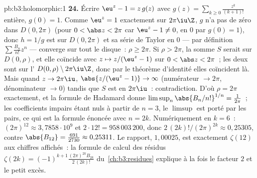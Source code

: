 \begin{solution}{pb:b3:holomorphic:1}
\textbf{24.} Écrire $\eu^z - 1 = z\,g(z)$ avec $g(z) =
\sum_{k\geq0}\frac{z^k}{(k+1)!}$ entière, $g(0) = 1$. Comme
$\eu^z = 1$ exactement sur $2\pi\iu\Z$, $g$ n'a pas de zéro
dans $D(0, 2\pi)$ (pour $0 < \abs z < 2\pi$ car $\eu^z - 1
\neq 0$, en $0$ par $g(0) = 1$), donc $h = 1/g$ est
 sur $D(0,2\pi)$ et sa série de Taylor en $0$ ---
par définition $\sum\frac{B_n}{n!}z^n$ --- converge sur tout
le disque~: $\rho \geq 2\pi$. Si $\rho > 2\pi$, la somme $S$
serait  sur $D(0,\rho)$, et elle coïncide avec $z
\mapsto z/(\eu^z - 1)$ sur $0 < \abs z < 2\pi$~; les deux
sont  sur l'  $D(0,\rho) \setminus
2\pi\iu\Z$, donc par le théorème d'identité elles
coïncident là. Mais quand $z \to 2\pi\iu$, $\abs{z/(\eu^z -
1)} \to \infty$ (numérateur $\to 2\pi$, dénominateur $\to
0$) tandis que $S$ est  en $2\pi\iu$~:
contradiction. D'où $\rho = 2\pi$ exactement, et la formule
de Hadamard donne $\limsup_n\abs{B_n/n!}^{1/n} =
\frac1{2\pi}$~; les coefficients impairs étant nuls à
partir de $n = 3$, le $\limsup$ est porté par les 
pairs, ce qui est la formule énoncée avec $n = 2k$.
Numériquement en $k = 6$~: $(2\pi)^{12} \approx
3{,}7858\cdot10^9$ et $2\cdot12! = 958\,003\,200$, donc
$2\,(2k)!/(2\pi)^{2k} \approx 0{,}25305$, contre
$\abs{B_{12}} = \frac{691}{2730} \approx 0{,}25311$. Le
rapport, $1{,}00025$, est exactement $\zeta(12)$ aux
chiffres affichés~: la formule de calcul des résidus
$\zeta(2k) =
(-1)^{k+1}\frac{(2\pi)^{2k}B_{2k}}{2\,(2k)!}$
du~\cref{ch:b3:residues} explique à la fois le facteur $2$
et le petit excès.


\end{solution}

